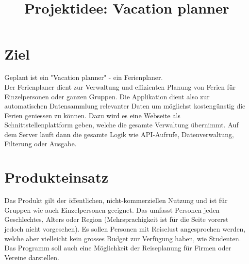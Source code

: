 \documentclass[10pt,a4paper,titlepage,twoside,german,final]{zhawreprt}
\title{Projektidee: Vacation planner}
\begin{document}
\maketitle

\makeatletter
\renewcommand*{\sls@headbelow@linethickness}{0pt}
\renewcommand*{\sls@footabove@linethickness}{0pt}
\makeatother

\tableofcontents

\thispagestyle{nonnumbering}
\newpage
\setcounter{page}{1}
\renewcommand{\thesection}{\arabic{section}}
\renewcommand{\thetable}{\arabic{table}}
\makeatletter
\renewcommand*{\sls@headbelow@linethickness}{1pt}
\renewcommand*{\sls@footabove@linethickness}{1pt}
\makeatother

\section{Ziel}\label{chp:Objective}
Geplant ist ein "Vacation planner" - ein Ferienplaner.\\
Der Ferienplaner dient zur Verwaltung und effizienten Planung von Ferien für Einzelpersonen oder ganzen Gruppen. Die Applikation dient also zur automatischen Datensammlung relevanter Daten um möglichst kostengünstig die Ferien geniessen zu können. Dazu wird es eine Webseite als Schnittstellenplattform geben, welche die gesamte Verwaltung übernimmt. Auf dem Server läuft dann die gesamte Logik wie API-Aufrufe, Datenverwaltung, Filterung oder Ausgabe.
\section{Produkteinsatz}\label{chp:FieldOfApplience}
Das Produkt gilt der öffentlichen, nicht-kommerziellen Nutzung und ist für Gruppen wie auch Einzelpersonen geeignet. Das umfasst Personen jeden Geschlechtes, Alters oder Region (Mehrsprachigkeit ist für die Seite vorerst jedoch nicht vorgesehen). Es sollen Personen mit Reiselust angesprochen werden, welche aber vielleicht kein grosses Budget zur Verfügung haben, wie Studenten. Das Programm soll auch eine Möglichkeit der Reiseplanung für Firmen oder Vereine darstellen.
\end{document}
